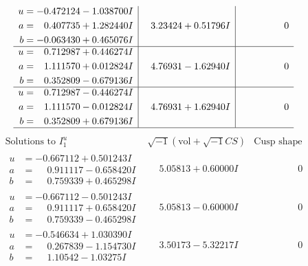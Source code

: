 \documentclass[1p]{elsarticle_modified}
\theoremstyle{definition}
\newcommand{\I}{\sqrt{-1}}
\begin{document}
$$\begin{array}{c|c|c}
\begin{aligned}
u &= -0.472124 - 1.038700 I \\
a &= \phantom{-}0.407735 + 1.282440 I \\
b &= -0.063430 + 0.465076 I\end{aligned}
 & \phantom{-}3.23424 + 0.51796 I & \phantom{-0.000000 } 0 \\ \hline\begin{aligned}
u &= \phantom{-}0.712987 + 0.446274 I \\
a &= \phantom{-}1.111570 + 0.012824 I \\
b &= \phantom{-}0.352809 - 0.679136 I\end{aligned}
 & \phantom{-}4.76931 - 1.62940 I & \phantom{-0.000000 } 0 \\ \hline\begin{aligned}
u &= \phantom{-}0.712987 - 0.446274 I \\
a &= \phantom{-}1.111570 - 0.012824 I \\
b &= \phantom{-}0.352809 + 0.679136 I\end{aligned}
 & \phantom{-}4.76931 + 1.62940 I & \phantom{-0.000000 } 0\\
 \hline 
 \end{array}$$\newpage$$\begin{array}{c|c|c}  
\text{Solutions to }I^u_{1}& \I (\text{vol} + \sqrt{-1}CS) & \text{Cusp shape}\\
 \hline 
\begin{aligned}
u &= -0.667112 + 0.501243 I \\
a &= \phantom{-}0.911117 - 0.658420 I \\
b &= \phantom{-}0.759339 + 0.465298 I\end{aligned}
 & \phantom{-}5.05813 + 0.60000 I & \phantom{-0.000000 } 0 \\ \hline\begin{aligned}
u &= -0.667112 - 0.501243 I \\
a &= \phantom{-}0.911117 + 0.658420 I \\
b &= \phantom{-}0.759339 - 0.465298 I\end{aligned}
 & \phantom{-}5.05813 - 0.60000 I & \phantom{-0.000000 } 0 \\ \hline\begin{aligned}
u &= -0.546634 + 1.030390 I \\
a &= \phantom{-}0.267839 - 1.154730 I \\
b &= \phantom{-}1.10542 - 1.03275 I\end{aligned}
 & \phantom{-}3.50173 - 5.32217 I & \phantom{-0.000000 } 0 \\ \hline\begin{aligned}

\end{aligned}
\end{array}$$
\end{document}
